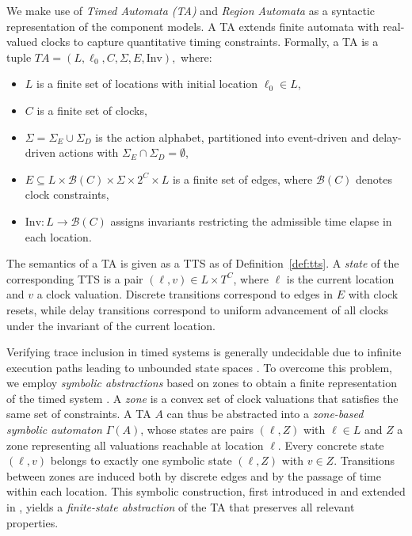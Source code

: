 We make use of \emph{Timed Automata (TA)} and \emph{Region Automata} \cite{ALUR19932, Bouyer2005AnIT} as a syntactic representation of the component models. A TA extends finite automata with real-valued clocks to capture quantitative timing constraints. Formally, a TA is a tuple
\(
TA = (L, \ell_0, C, \Sigma, E, \text{Inv}),
\) 
where:
\begin{itemize}
  \item $L$ is a finite set of locations with initial location $\ell_0 \in L$,
  \item $C$ is a finite set of clocks,
  \item $\Sigma = \Sigma_E \cup \Sigma_D$ is the action alphabet, partitioned into event-driven and delay-driven actions with $\Sigma_E \cap \Sigma_D = \emptyset$,
  \item $E \subseteq L \times \mathcal{B}(C) \times \Sigma \times 2^C \times L$ is a finite set of edges, where $\mathcal{B}(C)$ denotes clock constraints,
  \item $\text{Inv}: L \to \mathcal{B}(C)$ assigns invariants restricting the admissible time elapse in each location.
\end{itemize}




The semantics of a TA is given as a TTS as of Definition~\ref{def:tts}. A \emph{state} of the corresponding TTS is a pair $(\ell, v) \in L \times T^C$, where $\ell$ is the current location and $v$ a clock valuation. %
Discrete transitions correspond to edges in $E$ with clock resets, while delay transitions correspond to uniform advancement of all clocks under the invariant of the current location.  

Verifying trace inclusion in timed systems is generally undecidable due to infinite execution paths leading to unbounded state spaces \cite{AD94}. To overcome this problem, we employ \emph{symbolic abstractions} based on zones to obtain a finite representation of the timed system \cite{ALUR19932, Bouyer2005AnIT}. A \emph{zone} is a convex set of clock valuations that satisfies the same set of constraints. A TA $A$ can thus be abstracted into a \emph{zone-based symbolic automaton} $\Gamma(A)$, whose states are pairs $(\ell, Z)$ with $\ell \in L$ and $Z$ a zone representing all valuations reachable at location $\ell$. Every concrete state $(\ell, v)$ belongs to exactly one symbolic state $(\ell, Z)$ with $v \in Z$. Transitions between zones are induced both by discrete edges and by the passage of time within each location. This symbolic construction, first introduced in \cite{ALUR19932} and extended in \cite{Bouyer2005AnIT}, yields a \emph{finite-state abstraction} of the TA that preserves all relevant properties. 




